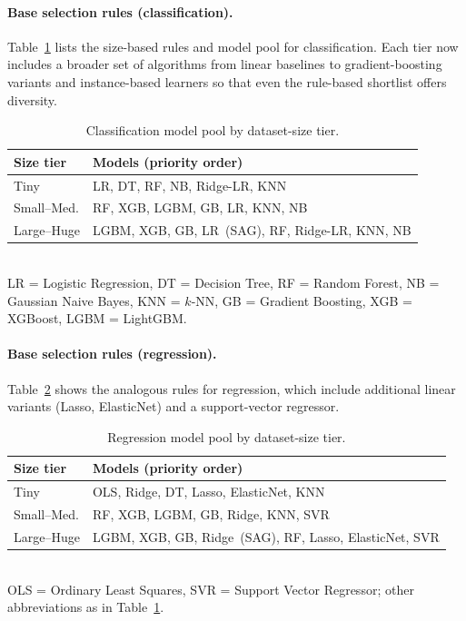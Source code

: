 \documentclass[conference]{IEEEtran}
\begin{document}
   \paragraph{Base selection rules (classification).}
   Table~\ref{tab:cls_rules} lists the size-based rules and model pool for classification.  Each tier now includes a broader set of algorithms from linear baselines to gradient-boosting variants and instance-based learners so that even the rule-based shortlist offers diversity.

   \begin{table}[ht]
   \centering
   \caption{Classification model pool by dataset-size tier.}
   \label{tab:cls_rules}
   \small
   \begin{tabular}{@{}lp{4.7cm}@{}}
   \hline
   \textbf{Size tier} & \textbf{Models (priority order)} \\
   \hline
   Tiny & LR, DT, RF, NB, Ridge-LR, KNN \\
   Small--Med. & RF, XGB, LGBM, GB, LR, KNN, NB \\
   Large--Huge & LGBM, XGB, GB, LR~(SAG), RF, Ridge-LR, KNN, NB \\
   \hline
   \end{tabular}
   \vspace{1mm}
   \\{\scriptsize LR = Logistic Regression, DT = Decision Tree, RF = Random Forest, NB = Gaussian Naive Bayes, KNN = $k$-NN, GB = Gradient Boosting, XGB = XGBoost, LGBM = LightGBM.}
   \end{table}

   \paragraph{Base selection rules (regression).}
   Table~\ref{tab:reg_rules} shows the analogous rules for regression, which include additional linear variants (Lasso, ElasticNet) and a support-vector regressor.

   \begin{table}[ht]
   \centering
   \caption{Regression model pool by dataset-size tier.}
   \label{tab:reg_rules}
   \small
   \begin{tabular}{@{}lp{4.7cm}@{}}
   \hline
   \textbf{Size tier} & \textbf{Models (priority order)} \\
   \hline
   Tiny & OLS, Ridge, DT, Lasso, ElasticNet, KNN \\
   Small--Med. & RF, XGB, LGBM, GB, Ridge, KNN, SVR \\
   Large--Huge & LGBM, XGB, GB, Ridge~(SAG), RF, Lasso, ElasticNet, SVR \\
   \hline
   \end{tabular}
   \vspace{1mm}
   \\{\scriptsize OLS = Ordinary Least Squares, SVR = Support Vector Regressor; other abbreviations as in Table~\ref{tab:cls_rules}.}
   \end{table}
\end{document}
